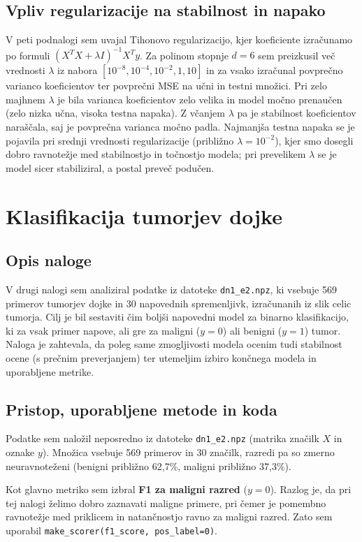 \documentclass[12pt,a4paper]{article}
\begin{document}
\subsection{Vpliv regularizacije na stabilnost in napako}
V peti podnalogi sem uvajal Tihonovo regularizacijo,
kjer koeficiente izračunamo po formuli $(X^T X + \lambda I)^{-1} X^T y$.
Za polinom stopnje $d=6$ sem preizkusil več vrednosti $\lambda$ iz 
nabora $[10^{-8}, 10^{-4}, 10^{-2}, 1, 10]$ in za vsako izračunal povprečno varianco
koeficientov ter povprečni MSE na učni in testni množici.
Pri zelo majhnem $\lambda$ je bila varianca koeficientov zelo velika
in model močno prenaučen (zelo nizka učna, visoka testna napaka).
Z včanjem $\lambda$ pa je stabilnost koeficientov naraščala, saj je 
povprečna varianca močno padla. Najmanjša testna napaka se je pojavila pri srednji 
vrednosti regularizacije (približno $\lambda = 10^{-2}$), kjer smo dosegli dobro 
ravnotežje med stabilnostjo in točnostjo modela; pri prevelikem $\lambda$ se je model 
sicer stabiliziral, a postal preveč podučen.


\section{Klasifikacija tumorjev dojke}

\subsection{Opis naloge}
V drugi nalogi sem analiziral podatke iz datoteke \texttt{dn1\_e2.npz}, ki vsebuje 569 primerov tumorjev dojke in 30 napovednih spremenljivk, izračunanih iz slik celic tumorja. Cilj je bil sestaviti čim boljši napovedni model za binarno klasifikacijo, ki za vsak primer napove, ali gre za maligni ($y = 0$) ali benigni ($y = 1$) tumor.
Naloga je zahtevala, da poleg same zmogljivosti modela ocenim tudi stabilnost ocene (s prečnim preverjanjem) ter utemeljim izbiro končnega modela in uporabljene metrike.

\subsection{Pristop, uporabljene metode in koda}
Podatke sem naložil neposredno iz datoteke \texttt{dn1\_e2.npz} (matrika značilk $X$ in oznake $y$). Množica vsebuje 569 primerov in 30 značilk, razredi pa so zmerno neuravnoteženi (benigni približno 62{,}7\%, maligni približno 37{,}3\%).

Kot glavno metriko sem izbral \textbf{F1 za maligni razred} ($y=0$). Razlog je, da pri tej nalogi želimo dobro zaznavati maligne primere, pri čemer je pomembno ravnotežje med priklicem in natančnostjo ravno za maligni razred. Zato sem uporabil \texttt{make\_scorer(f1\_score, pos\_label=0)}.
\end{document}
